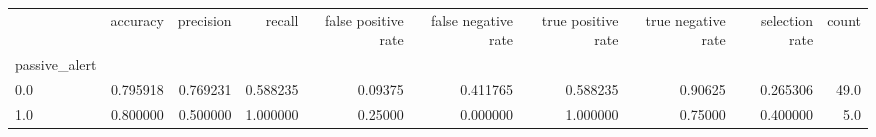 \begin{tabular}{lrrrrrrrrr}
\toprule
{} &  accuracy &  precision &    recall &  false positive rate &  false negative rate &  true positive rate &  true negative rate &  selection rate &  count \\
passive\_alert &           &            &           &                      &                      &                     &                     &                 &        \\
\midrule
0.0           &  0.795918 &   0.769231 &  0.588235 &              0.09375 &             0.411765 &            0.588235 &             0.90625 &        0.265306 &   49.0 \\
1.0           &  0.800000 &   0.500000 &  1.000000 &              0.25000 &             0.000000 &            1.000000 &             0.75000 &        0.400000 &    5.0 \\
\bottomrule
\end{tabular}
